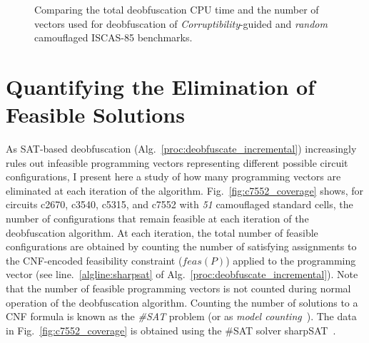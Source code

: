 \documentclass[proposal]{umassthesis}  %
\begin{document}


    \begin{figure}[!ht]
  \centering
    \hspace{20pt}
    \caption{Comparing the total deobfuscation CPU time and the number of vectors used for deobfuscation of \textit{Corruptibility}-guided and \textit{random} camouflaged ISCAS-85 benchmarks.}
    \vspace{-2mm}
    \label{fig:comparison_corrupt_random}
  \end{figure}


\section{Quantifying the Elimination of Feasible Solutions}
As SAT-based deobfuscation (Alg.~\ref{proc:deobfuscate_incremental}) increasingly rules out infeasible programming vectors representing different possible circuit configurations, I present here a study of how many programming vectors are eliminated at each iteration of the algorithm. Fig.~\ref{fig:c7552_coverage} shows, for circuits c2670, c3540, c5315, and c7552 with \textit{51} camouflaged standard cells, the number of configurations that remain feasible at each iteration of the deobfuscation algorithm. At each iteration, the total number of feasible configurations are obtained by counting the number of satisfying assignments to the CNF-encoded feasibility constraint ($feas(P)$) applied to the programming vector (see line.~\ref{algline:sharpsat} of Alg.~\ref{proc:deobfuscate_incremental}). Note that the number of feasible programming vectors is not counted during normal operation of the deobfuscation algorithm. Counting the number of solutions to a CNF formula is known as the \textit{\#SAT} problem (or as \textit{model counting}~\cite{birnbaum1999good}). The data in Fig.~\ref{fig:c7552_coverage} is obtained using the \#SAT solver sharpSAT~\cite{thurley2006sharpsat}.
\end{document}
